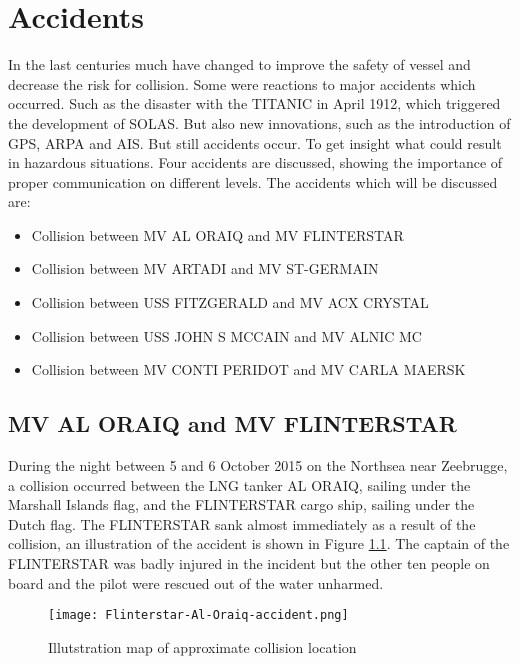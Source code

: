 \chapter{Accidents}
\label{app:accidents}
In the last centuries much have changed to improve the safety of vessel and decrease the risk for collision. Some were reactions to major accidents which occurred. Such as the disaster with the TITANIC in April 1912, which triggered the development of \ac{SOLAS}. But also new innovations, such as the introduction of \ac{GPS}, \ac{ARPA} and \ac{AIS}. But still accidents occur. To get insight what could result in hazardous situations. Four accidents are discussed, showing the importance of proper communication on different levels. The accidents which will be discussed are:
\begin{itemize}
	\item Collision between MV AL ORAIQ and MV FLINTERSTAR
	\item Collision between MV ARTADI and MV ST-GERMAIN
	\item Collision between USS FITZGERALD and MV ACX CRYSTAL
	\item Collision between USS JOHN S MCCAIN and MV ALNIC MC
	\item Collision between MV CONTI PERIDOT and MV CARLA MAERSK
\end{itemize}

\newpage
\section{MV AL ORAIQ and MV FLINTERSTAR}
\label{sec:al-oraiq-vs-flinterstar}
During the night between 5 and 6 October 2015 on the Northsea near Zeebrugge, a collision occurred between the LNG tanker AL ORAIQ, sailing under the Marshall Islands flag, and the FLINTERSTAR cargo ship, sailing under the Dutch flag. The FLINTERSTAR sank almost immediately as a result of the collision, an illustration of the accident is shown in Figure \ref{fig:Accident-Flinterstar-Al-Oraiq}. The captain of the FLINTERSTAR was badly injured in the incident but the other ten people on board and the pilot were rescued out of the water unharmed.

\begin{figure}[H]
	\centering
	\texttt{[image: Flinterstar-Al-Oraiq-accident.png]}
	\caption{Illutstration map of approximate collision location}
	\label{fig:Accident-Flinterstar-Al-Oraiq}
\end{figure}


